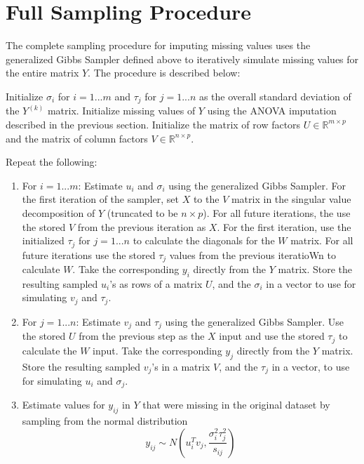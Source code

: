 \documentclass[12pt,twoside]{dukestatscithesis}
\theoremstyle{definition}
\theoremstyle{definition}
\theoremstyle{definition}
\theoremstyle{remark}
\begin{document}
\section{Full Sampling Procedure}\label{full-sampling-procedure}

The complete sampling procedure for imputing missing values uses the
generalized Gibbs Sampler defined above to iteratively simulate missing
values for the entire matrix \(Y\). The procedure is described below:

Initialize \(\sigma_i\) for \(i = 1 ... m\) and \(\tau_j\) for
\(j = 1 ... n\) as the overall standard deviation of the \(Y^{(k)}\)
matrix. Initialize missing values of \(Y\) using the ANOVA imputation
described in the previous section. Initialize the matrix of row factors
\(U \in \mathbb{R}^{m \times p}\) and the matrix of column factors
\(V \in \mathbb{R}^{n \times p}\).

Repeat the following:
\begin{enumerate}
\def\labelenumi{\arabic{enumi}.}
\item
  For \(i = 1 ... m\): Estimate \(u_i\) and \(\sigma_i\) using the
  generalized Gibbs Sampler. For the first iteration of the sampler, set
  \(X\) to the \(V\) matrix in the singular value decomposition of \(Y\)
  (truncated to be \(n \times p\)). For all future iterations, the use
  the stored \(V\) from the previous iteration as \(X\). For the first
  iteration, use the initialized \(\tau_j\) for \(j = 1 ... n\) to
  calculate the diagonals for the \(W\) matrix. For all future
  iterations use the stored \(\tau_j\) values from the previous
  iteratioWn to calculate \(W\). Take the corresponding \(y_i\) directly
  from the \(Y\) matrix. Store the resulting sampled \(u_i\)'s as rows
  of a matrix \(U\), and the \(\sigma_i\) in a vector to use for
  simulating \(v_j\) and \(\tau_j\).
\item
  For \(j = 1 ... n\): Estimate \(v_j\) and \(\tau_j\) using the
  generalized Gibbs Sampler. Use the stored \(U\) from the previous step
  as the \(X\) input and use the stored \(\tau_j\) to calculate the
  \(W\) input. Take the corresponding \(y_j\) directly from the \(Y\)
  matrix. Store the resulting sampled \(v_j\)'s in a matrix \(V\), and
  the \(\tau_j\) in a vector, to use for simulating \(u_i\) and
  \(\sigma_j\).
\item
  Estimate values for \(y_{ij}\) in \(Y\) that were missing in the
  original dataset by sampling from the normal distribution
  \[y_{ij} \sim N(u_i^Tv_j, \frac{\sigma_i^2\tau_j^2}{s_{ij}})\]
\end{enumerate}
\end{document}
